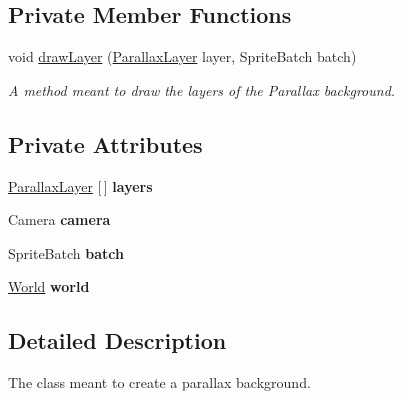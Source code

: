 \subsection*{Private Member Functions}
\begin{DoxyCompactItemize}
\item 
void \hyperlink{classnl_1_1arjanfrans_1_1mario_1_1view_1_1ParallaxBackground_a1be3d3c6f4d8e0e74f3cae3cc77bd86a}{draw\+Layer} (\hyperlink{classnl_1_1arjanfrans_1_1mario_1_1view_1_1ParallaxLayer}{Parallax\+Layer} layer, Sprite\+Batch batch)
\begin{DoxyCompactList}\small\item\em A method meant to draw the layers of the Parallax background. \end{DoxyCompactList}\end{DoxyCompactItemize}
\subsection*{Private Attributes}
\begin{DoxyCompactItemize}
\item 
\mbox{\label{classnl_1_1arjanfrans_1_1mario_1_1view_1_1ParallaxBackground_a211e859b253400b48342c39b2ee5bc83}} 
\hyperlink{classnl_1_1arjanfrans_1_1mario_1_1view_1_1ParallaxLayer}{Parallax\+Layer} \mbox{[}$\,$\mbox{]} {\bfseries layers}
\item 
\mbox{\label{classnl_1_1arjanfrans_1_1mario_1_1view_1_1ParallaxBackground_ab5f4b2babf8d021339dc9d3071910963}} 
Camera {\bfseries camera}
\item 
\mbox{\label{classnl_1_1arjanfrans_1_1mario_1_1view_1_1ParallaxBackground_acf3064f2616488f3faafe0f524490b15}} 
Sprite\+Batch {\bfseries batch}
\item 
\mbox{\label{classnl_1_1arjanfrans_1_1mario_1_1view_1_1ParallaxBackground_a5e17b02daeb130aa81b146d417d0a86f}} 
\hyperlink{classnl_1_1arjanfrans_1_1mario_1_1model_1_1World}{World} {\bfseries world}
\end{DoxyCompactItemize}


\subsection{Detailed Description}
The class meant to create a parallax background. 


